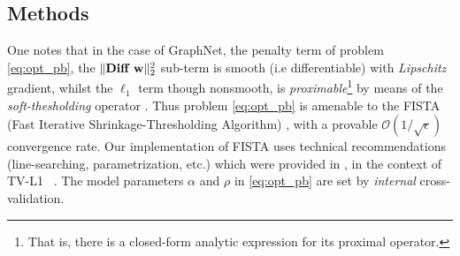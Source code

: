 \subsection{Methods}


One notes that in the case of GraphNet, the penalty term %
of problem
\eqref{eq:opt_pb}, the $\|\textbf{Diff }
\mathbf{w}\|^2_2$ sub-term is smooth (i.e differentiable) with
\textit{Lipschitz} gradient, whilst the $\ell_{1}$ term though
nonsmooth, is \textit{proximable}\footnote{That is, there is a
  closed-form analytic expression for its proximal operator.} by means
of the \textit{soft-thesholding} operator  \citep{daubechies2004}.  Thus
problem \eqref{eq:opt_pb} is amenable to the FISTA (Fast Iterative
Shrinkage-Thresholding Algorithm)  \citep{beck09fista}, with a provable
$\mathcal{O}(1/\sqrt{\epsilon})$ convergence rate. Our implementation
of FISTA uses technical recommendations
(line-searching, parametrization, etc.) which were provided in
 \citep{dohmatob2014benchmarking}, in the context of TV-L1
 ~\citep{baldassarre2012,gramfort2013}. The model parameters $\alpha$ and
$\rho$ in \eqref{eq:opt_pb} are set by \textit{internal}
cross-validation.




